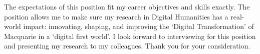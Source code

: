 \documentclass[11pt, a4paper]{awesome-cv}
\begin{document}
\begin{cvletter}


The expectations of this position fit my career objectives and skills exactly. The position allows me to make sure my research in Digital Humanities has a real-world impact: innovating, shaping, and improving the `Digital Transformation' of Macquarie in a `digital first world'. I look forward to interviewing for this position and presenting my research to my colleagues. Thank you for your consideration.

\end{cvletter}




\makeletterclosing
\end{document}
